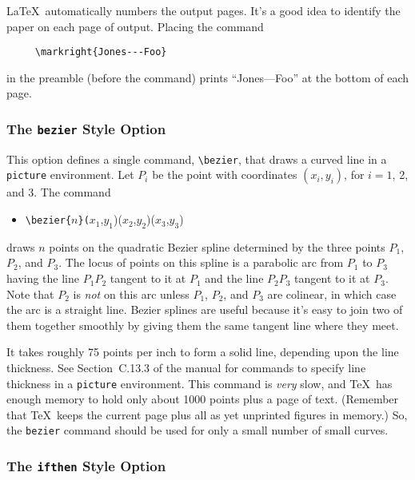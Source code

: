 \LaTeX\ automatically numbers the output pages.  It's a good idea 
to identify the paper on each page of output.  Placing the command
\begin{verbatim}
     \markright{Jones---Foo}
\end{verbatim}
in the preamble (before the \hbox{\verb||} command)
prints ``Jones---Foo'' at the bottom of each page.  

\subsubsection{The {\tt bezier} Style Option}

This option defines a single command, \hbox{\verb|\bezier|}, that draws
a curved line in a {\tt picture} environment.  Let $P_{i}$ be the point
with coordinates $(x_{i},y_{i})$, for $i=1$, 2, and 3.  The command
\begin{itemize} \tt
\item[]
\verb|\bezier{|$n$\verb|}(|$x_{1}$,$y_{1}$)($x_{2}$,$y_{2}$)($x_{3}$,$y_{3}$)
\end{itemize}
draws $n$ points on the quadratic Bezier spline determined by the three
points $P_{1}$, $P_{2}$, and $P_{3}$.  The locus of points on this
spline is a parabolic arc from $P_{1}$ to $P_{3}$ having the line
$P_{1}P_{2}$ tangent to it at $P_{1}$ and the line $P_{2}P_{3}$ tangent
to it at $P_{3}$.  Note that $P_{2}$ is {\em not\/} on this arc unless
$P_{1}$, $P_{2}$, and $P_{3}$ are colinear, in which case the arc is a
straight line.  Bezier splines are useful because it's easy to join two
of them together smoothly by giving them the same tangent line where
they meet.

It takes roughly 75 points per inch to form a solid line, depending
upon the line thickness.  See Section~C.13.3 of the manual for commands
to specify line thickness in a {\tt picture} environment.  This command
is {\em very\/} slow, and \TeX\ has enough memory to hold only about
1000 points plus a page of text.  (Remember that \TeX\ keeps the
current page plus all as yet unprinted figures in memory.) So, the
\verb|bezier| command should be used for only a small number of small
curves.


\subsubsection{The {\tt ifthen} Style Option}


